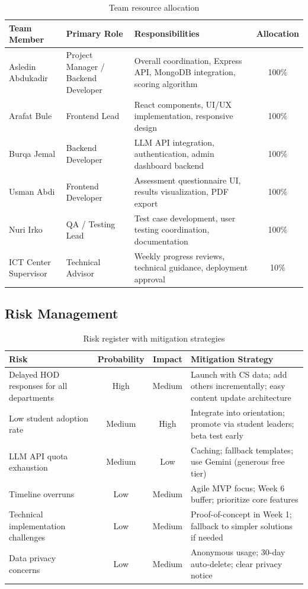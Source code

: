 ﻿\documentclass[12pt, a4paper]{article}
\newcommand{\theadrow}{\rowcolor{tableheader}}
\newcommand{\rowalt}{\rowcolor{tablerowalt}}
\begin{document}
\begin{table}[H]
\centering
\begin{tabularx}{\textwidth}{p{3cm}p{3cm}Xc}
\toprule
\theadrow
\textbf{Team Member} & \textbf{Primary Role} & \textbf{Responsibilities} & \textbf{Allocation} \\
\midrule
Asledin Abdukadir & Project Manager / Backend Developer & Overall coordination, Express API, MongoDB integration, scoring algorithm & 100\% \\[3pt]
\rowalt
Arafat Bule & Frontend Lead & React components, UI/UX implementation, responsive design & 100\% \\[3pt]
Burqa Jemal & Backend Developer & LLM API integration, authentication, admin dashboard backend & 100\% \\[3pt]
\rowalt
Usman Abdi & Frontend Developer & Assessment questionnaire UI, results visualization, PDF export & 100\% \\[3pt]
Nuri Irko & QA / Testing Lead & Test case development, user testing coordination, documentation & 100\% \\[3pt]
\rowalt
ICT Center Supervisor & Technical Advisor & Weekly progress reviews, technical guidance, deployment approval & 10\% \\
\bottomrule
\end{tabularx}
\caption{Team resource allocation}
\end{table}

\subsection{Risk Management}

\begin{table}[H]
\centering
\begin{tabularx}{\textwidth}{p{3.5cm}ccp{6cm}}
\toprule
\theadrow
\textbf{Risk} & \textbf{Probability} & \textbf{Impact} & \textbf{Mitigation Strategy} \\
\midrule
Delayed HOD responses for all departments & High & Medium & Launch with CS data; add others incrementally; easy content update architecture \\[4pt]
\rowalt
Low student adoption rate & Medium & High & Integrate into orientation; promote via student leaders; beta test early \\[4pt]
LLM API quota exhaustion & Medium & Low & Caching; fallback templates; use Gemini (generous free tier) \\[4pt]
\rowalt
Timeline overruns & Low & Medium & Agile MVP focus; Week 6 buffer; prioritize core features \\[4pt]
Technical implementation challenges & Low & Medium & Proof-of-concept in Week 1; fallback to simpler solutions if needed \\[4pt]
\rowalt
Data privacy concerns & Low & Medium & Anonymous usage; 30-day auto-delete; clear privacy notice \\
\bottomrule
\end{tabularx}
\caption{Risk register with mitigation strategies}
\end{table}
\end{document}
